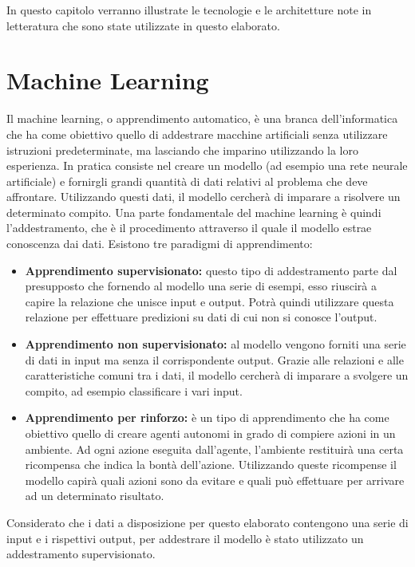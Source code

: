 \documentclass[12pt,a4paper,twoside,openright]{book}
\begin{document}
In questo capitolo verranno illustrate le tecnologie e le architetture note in letteratura che sono state utilizzate in questo elaborato.
\section{Machine Learning}

Il machine learning, o apprendimento automatico, è una branca dell'informatica che ha come obiettivo quello di addestrare macchine artificiali senza utilizzare istruzioni predeterminate, ma lasciando che imparino utilizzando la loro esperienza.
In pratica consiste nel creare un modello (ad esempio una rete neurale artificiale) e fornirgli grandi quantità di dati relativi al problema che deve affrontare. Utilizzando questi dati, il modello cercherà di imparare a risolvere un determinato compito.
Una parte fondamentale del machine learning è quindi l'addestramento, che è il procedimento attraverso il quale il modello estrae conoscenza dai dati. Esistono tre paradigmi di apprendimento:
\begin{itemize}
    \item \textbf{Apprendimento supervisionato:} questo tipo di addestramento parte dal presupposto che fornendo al modello una serie di esempi, esso riuscirà a capire la relazione che unisce input e output. Potrà quindi utilizzare questa relazione per effettuare predizioni su dati di cui non si conosce l'output.
    \item \textbf{Apprendimento non supervisionato:} al modello vengono forniti una serie di dati in input ma senza il corrispondente output.  Grazie alle relazioni e alle caratteristiche comuni tra i dati, il modello cercherà di imparare a svolgere un compito, ad esempio classificare i vari input.
    \item \textbf{Apprendimento per rinforzo:} è un tipo di apprendimento che ha come obiettivo quello di creare agenti autonomi in grado di compiere azioni in un ambiente. Ad ogni azione eseguita dall'agente, l'ambiente restituirà una certa ricompensa che indica la bontà dell'azione. Utilizzando queste ricompense il modello capirà quali azioni sono da evitare e quali può effettuare per arrivare ad un determinato risultato.
\end{itemize}
Considerato che i dati a disposizione per questo elaborato contengono una serie di input e i rispettivi output, per addestrare il modello è stato utilizzato un addestramento supervisionato.
\end{document}
